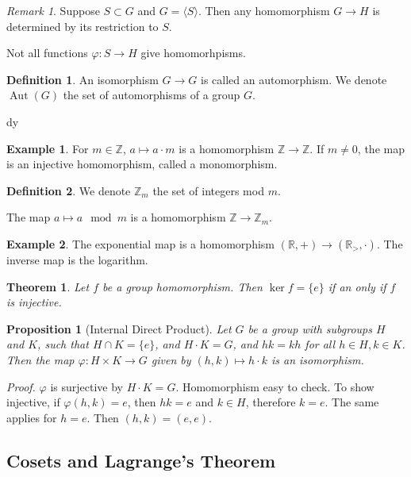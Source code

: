 \documentclass[12pt, reqno]{article}
\theoremstyle{plain}
\newtheorem{theorem}{Theorem}[section]
\newtheorem{proposition}{Proposition}
\theoremstyle{definition}
\newtheorem*{definition}{Definition}
\newtheorem*{example}{Example}
\theoremstyle{remark}
\newtheorem*{remark}{Remark}
\renewcommand{\phi}{\varphi}
\newcommand{\RR}{\mathbb{R}}
\newcommand{\ZZ}{\mathbb{Z}}
\begin{document}
\begin{remark}
    Suppose $S \subset G$ and $G = \langle S \rangle$. Then any homomorphism $G \rightarrow H$ 
    is determined by its restriction to $S$. 

    Not all functions $\phi: S \rightarrow H$ give homomorhpisms. 
\end{remark}

\begin{definition}
    An isomorphism $G \rightarrow G$ is called an automorphism. We denote $\operatorname{Aut}(G)$
    the set of automorphisms of a group $G$.
\end{definition}
dy
\begin{example}
    For $m \in \mathbb{Z}$, $a \mapsto a\cdot m$ is a homomorphism $\mathbb{Z} \rightarrow \mathbb{Z}$.
    If $m \neq 0$, the map is an injective homomorphism, called a monomorphism.
\end{example}

\begin{definition}
    We denote $\ZZ_m$ the set of integers mod $m$.

    The map $a \mapsto a \mod m$ is a homomorphism $\ZZ \rightarrow \ZZ_m$.
\end{definition}

\begin{example}
    The exponential map is a homomorphism $(\RR, +) \rightarrow (\RR_>, \cdot)$. The inverse
    map is the logarithm.
\end{example}

\begin{theorem}
    Let $f$ be a group homomorphism. Then $\ker f = \{e\}$ if an only if $f$ is injective.
\end{theorem}

\begin{proposition}[Internal Direct Product]
    Let $G$ be a group with subgroups $H$ and $K$, such that $H \cap K = \{e\}$, and 
    $H\cdot K = G$, and $hk = kh$ for all $h \in H, k \in K$. Then the map 
    $\phi: H \times K \rightarrow G$ given by $(h,k) \mapsto h\cdot k$ is an isomorphism.
\end{proposition}

\textit{Proof.} $\phi$ is surjective by $H\cdot K = G$. Homomorphism easy to check. To show injective, 
if $\phi(h,k) = e$, then $hk = e$ and $k \in H$, therefore $k = e$. The same applies for $h = e$. Then $(h,k) = (e,e)$.

\subsection*{Cosets and Lagrange's Theorem}
\end{document}
